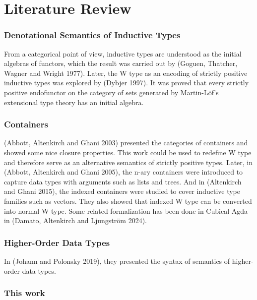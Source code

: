 \section{Literature Review}

\subsubsection*{Denotational Semantics of Inductive Types}

From a categorical point of view, inductive types are understood as the initial algebras of functors, which the result was carried out by (Goguen, Thatcher, Wagner and Wright 1977)\cite{goguen1977initial}. Later, the W type as an encoding of strictly positive inductive types was explored by (Dybjer 1997)\cite{dybjer1997representing}. It was proved that every strictly positive endofunctor on the category of sets generated by Martin-Löf's extensional type theory has an initial algebra.

\subsubsection*{Containers}

(Abbott, Altenkirch and Ghani 2003)\cite{abbott2003categories} presented the categories of containers and showed some nice closure properties. This work could be used to redefine W type and therefore serve as an alternative semantics of strictly positive types. Later, in (Abbott, Altenkirch and Ghani 2005)\cite{abbott2005containers}, the n-ary containers were introduced to capture data types with arguments such as lists and trees. And in (Altenkirch and Ghani 2015), the indexed containers were studied to cover inductive type families such as vectors. They also showed that indexed W type can be converted into normal W type. Some related formalization has been done in Cubical Agda in (Damato, Altenkirch and Ljungström 2024)\cite{damato2024formalising}.

\subsubsection*{Higher-Order Data Types}

In (Johann and Polonsky 2019)\cite{johann2019higher}, they presented the syntax of semantics of higher-order data types.

\subsubsection*{This work}

